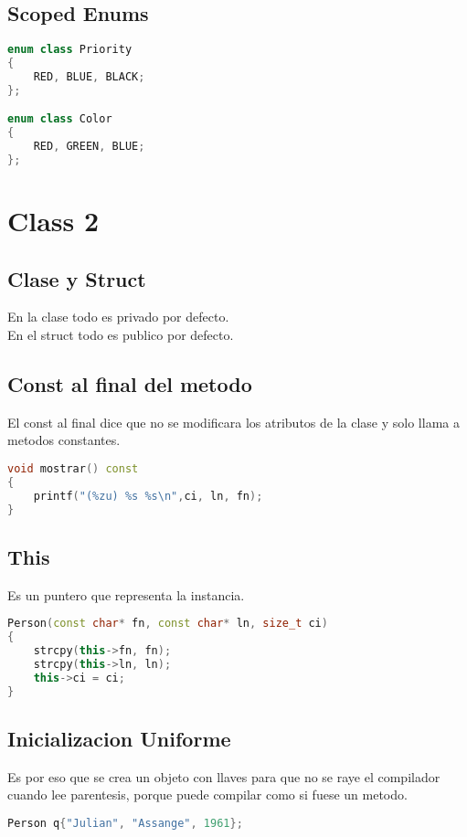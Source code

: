 \documentclass[11pt,letterpaper]{article}
\begin{document}
\subsection{Scoped Enums}
\begin{lstlisting}[language=C++, caption={Scoped enums}]
enum class Priority
{
	RED, BLUE, BLACK;
};

enum class Color
{
	RED, GREEN, BLUE;
};
\end{lstlisting}

\section{Class 2}
\subsection{Clase y Struct}
En la clase todo es privado por defecto.\\
En el struct todo es publico por defecto.
\subsection{Const al final del metodo}
El const al final dice que no se modificara los atributos de la clase
y solo llama a metodos constantes.
\begin{lstlisting}[language=C++, caption={method() const}]
void mostrar() const
{
    printf("(%zu) %s %s\n",ci, ln, fn);
}
\end{lstlisting}
\subsection{This}
Es un puntero que representa la instancia.

\begin{lstlisting}[language=C++, caption={this->}]
Person(const char* fn, const char* ln, size_t ci)
{
    strcpy(this->fn, fn);
    strcpy(this->ln, ln);
    this->ci = ci;
}
\end{lstlisting}

\subsection{Inicializacion Uniforme}
Es por eso que se crea un objeto con llaves {} para que no se raye el compilador cuando lee parentesis, 
porque puede compilar como si fuese un metodo.

\begin{lstlisting}[language=C++, caption={Inicializacion con llaves}]
Person q{"Julian", "Assange", 1961};
\end{lstlisting}
\end{document}
